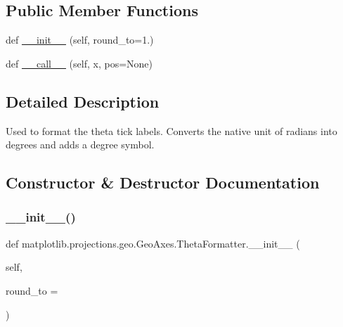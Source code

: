\subsection*{Public Member Functions}
\begin{DoxyCompactItemize}
\item 
def \hyperlink{classmatplotlib_1_1projections_1_1geo_1_1GeoAxes_1_1ThetaFormatter_a03f0a9be88206a3b5e4cadb8b2a117df}{\+\_\+\+\_\+init\+\_\+\+\_\+} (self, round\+\_\+to=1.)
\item 
def \hyperlink{classmatplotlib_1_1projections_1_1geo_1_1GeoAxes_1_1ThetaFormatter_a0f8e93f1bac2ad34671d6a4f08468009}{\+\_\+\+\_\+call\+\_\+\+\_\+} (self, x, pos=None)
\end{DoxyCompactItemize}


\subsection{Detailed Description}
\begin{DoxyVerb}Used to format the theta tick labels.  Converts the native
unit of radians into degrees and adds a degree symbol.
\end{DoxyVerb}
 

\subsection{Constructor \& Destructor Documentation}
\mbox{\label{classmatplotlib_1_1projections_1_1geo_1_1GeoAxes_1_1ThetaFormatter_a03f0a9be88206a3b5e4cadb8b2a117df}} 
\subsubsection{\texorpdfstring{\+\_\+\+\_\+init\+\_\+\+\_\+()}{\_\_init\_\_()}}
{\footnotesize\ttfamily def matplotlib.\+projections.\+geo.\+Geo\+Axes.\+Theta\+Formatter.\+\_\+\+\_\+init\+\_\+\+\_\+ (\begin{DoxyParamCaption}\item[{}]{self,  }\item[{}]{round\+\_\+to = {} }\end{DoxyParamCaption})}



